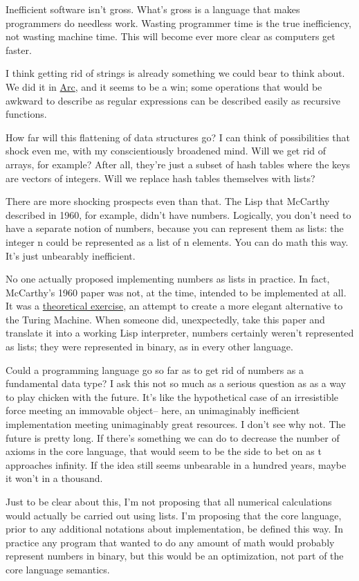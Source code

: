 Inefficient software isn't gross. What's gross is a language that makes
programmers do needless work. Wasting programmer time is the true
inefficiency, not wasting machine time. This will become ever more clear
as computers get faster.

I think getting rid of strings is already something we could bear to
think about. We did it in \href{arc.html}{Arc}, and it seems to be a
win; some operations that would be awkward to describe as regular
expressions can be described easily as recursive functions.

How far will this flattening of data structures go? I can think of
possibilities that shock even me, with my conscientiously broadened
mind. Will we get rid of arrays, for example? After all, they're just a
subset of hash tables where the keys are vectors of integers. Will we
replace hash tables themselves with lists?

There are more shocking prospects even than that. The Lisp that McCarthy
described in 1960, for example, didn't have numbers. Logically, you
don't need to have a separate notion of numbers, because you can
represent them as lists: the integer n could be represented as a list of
n elements. You can do math this way. It's just unbearably inefficient.

No one actually proposed implementing numbers as lists in practice. In
fact, McCarthy's 1960 paper was not, at the time, intended to be
implemented at all. It was a \href{rootsoflisp.html}{theoretical
exercise}, an attempt to create a more elegant alternative to the Turing
Machine. When someone did, unexpectedly, take this paper and translate
it into a working Lisp interpreter, numbers certainly weren't
represented as lists; they were represented in binary, as in every other
language.

Could a programming language go so far as to get rid of numbers as a
fundamental data type? I ask this not so much as a serious question as
as a way to play chicken with the future. It's like the hypothetical
case of an irresistible force meeting an immovable object-- here, an
unimaginably inefficient implementation meeting unimaginably great
resources. I don't see why not. The future is pretty long. If there's
something we can do to decrease the number of axioms in the core
language, that would seem to be the side to bet on as t approaches
infinity. If the idea still seems unbearable in a hundred years, maybe
it won't in a thousand.

Just to be clear about this, I'm not proposing that all numerical
calculations would actually be carried out using lists. I'm proposing
that the core language, prior to any additional notations about
implementation, be defined this way. In practice any program that wanted
to do any amount of math would probably represent numbers in binary, but
this would be an optimization, not part of the core language semantics.


